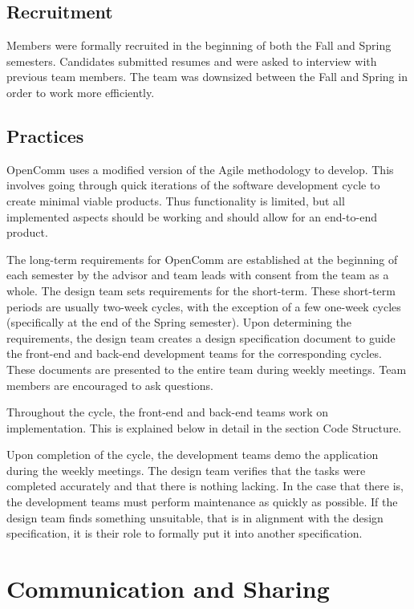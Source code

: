 \documentclass[12pt, letterpaper]{article}
\begin{document}
\subsection{Recruitment}
Members were formally recruited in the beginning of both the Fall and Spring semesters.  Candidates submitted resumes and were asked to interview with previous team members.  The team was downsized between the Fall and Spring in order to work more efficiently.  

\subsection{Practices}
OpenComm uses a modified version of the Agile methodology to develop.  This involves going through quick iterations of the software development cycle to create minimal viable products.  Thus functionality is limited, but all implemented aspects should be working and should allow for an end-to-end product.  

The long-term requirements for OpenComm are established at the beginning of each semester by the advisor and team leads with consent from the team as a whole.  The design team sets requirements for the short-term.  These short-term periods are usually two-week cycles, with the exception of a few one-week cycles (specifically at the end of the Spring semester).  Upon determining the requirements, the design team creates a design specification document to guide the front-end and back-end development teams for the corresponding cycles.  These documents are presented to the entire team during weekly meetings.  Team members are encouraged to ask questions.  

Throughout the cycle, the front-end and back-end teams work on implementation.  This is explained below in detail in the section Code Structure.  

Upon completion of the cycle, the development teams demo the application during the weekly meetings.  The design team verifies that the tasks were completed accurately and that there is nothing lacking.  In the case that there is, the development teams must perform maintenance as quickly as possible.  If the design team finds something unsuitable, that is in alignment with the design specification, it is their role to formally put it into another specification.  

\section{Communication and Sharing}
\end{document}
